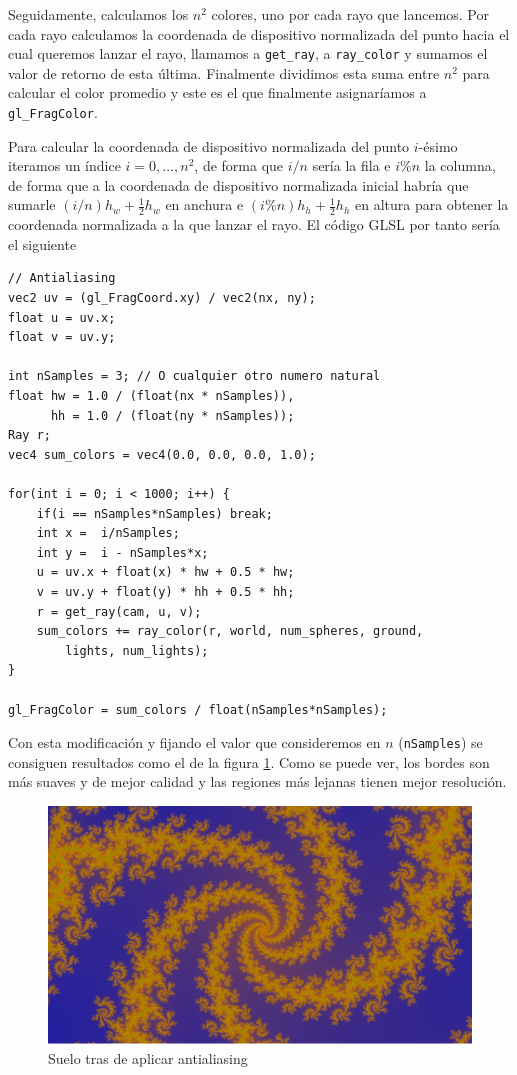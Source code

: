 Seguidamente, calculamos los $n^2$ colores, uno por cada rayo que lancemos. Por cada rayo calculamos la coordenada de dispositivo normalizada del punto hacia el cual queremos lanzar el rayo, llamamos a \verb|get_ray|, a \verb|ray_color| y sumamos el valor de retorno de esta última. Finalmente dividimos esta suma entre $n^2$ para calcular el color promedio y este es el que finalmente asignaríamos a \verb|gl_FragColor|.

Para calcular la coordenada de dispositivo normalizada del punto $i$-ésimo iteramos un índice $i=0,\dots,n^2$, de forma que $i/n$ sería la fila e $i\%n$ la columna, de forma que a la coordenada de dispositivo normalizada inicial habría que sumarle $(i/n)h_w + \frac{1}{2}h_w$ en anchura e $(i\%n)h_h+ \frac{1}{2}h_h$ en altura para obtener la coordenada normalizada a la que lanzar el rayo. El código GLSL por tanto sería el siguiente

\begin{lstlisting}
// Antialiasing
vec2 uv = (gl_FragCoord.xy) / vec2(nx, ny);
float u = uv.x;
float v = uv.y;

int nSamples = 3; // O cualquier otro numero natural
float hw = 1.0 / (float(nx * nSamples)),
      hh = 1.0 / (float(ny * nSamples));
Ray r;
vec4 sum_colors = vec4(0.0, 0.0, 0.0, 1.0);

for(int i = 0; i < 1000; i++) {
    if(i == nSamples*nSamples) break;
    int x =  i/nSamples;
    int y =  i - nSamples*x;
    u = uv.x + float(x) * hw + 0.5 * hw;
    v = uv.y + float(y) * hh + 0.5 * hh;
    r = get_ray(cam, u, v);
    sum_colors += ray_color(r, world, num_spheres, ground, 
        lights, num_lights);
}

gl_FragColor = sum_colors / float(nSamples*nSamples);
\end{lstlisting}

Con esta modificación y fijando el valor que consideremos en $n$ (\verb|nSamples|) se consiguen resultados como el de la figura \ref{fig:antialiasing-3D}. Como se puede ver, los bordes son más suaves y de mejor calidad y las regiones más lejanas tienen mejor resolución.

\begin{figure} [ht]
    \centering
    \includegraphics[width=130mm]{img/C7/antialiasing.png}
    \caption{Suelo tras de aplicar antialiasing}
    \label{fig:antialiasing-3D}
\end{figure}

